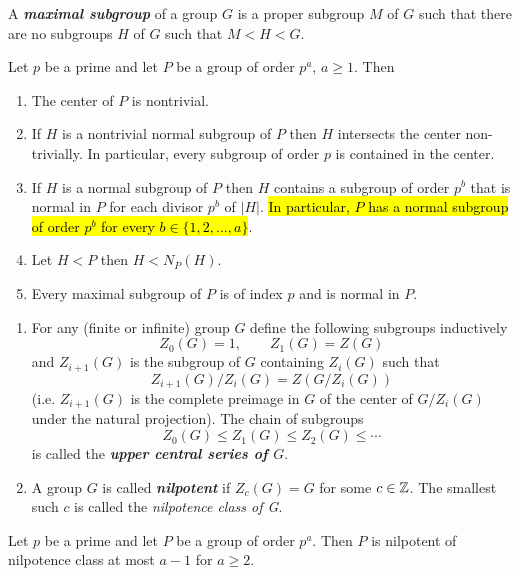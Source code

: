 \begin{defn}
A \textbf{\textit{maximal subgroup}} of a group $G$ is a proper subgroup $M$ of $G$ such that there are no subgroups $H$ of $G$ such that $M<H<G$.
\end{defn}

\nl

\begin{thm}
Let $p$ be a prime and let $P$ be a group of order $p^a$, $a\geq 1$. Then
\begin{enumerate}
\item The center of $P$ is nontrivial.
\item If $H$ is a nontrivial normal subgroup of $P$ then $H$ intersects the center non-trivially. In particular, every subgroup of order $p$ is contained in the center.
\item If $H$ is a normal subgroup of $P$ then $H$ contains a subgroup of order $p^b$ that is normal in $P$ for each divisor $p^b$ of $|H|$. \hl{In particular, $P$ has a normal subgroup of order $p^b$ for every $b\in \{1,2,\ldots,a\}$}.
\item Let $H< P$ then $H<N_P(H)$.
\item Every maximal subgroup of $P$ is of index $p$ and is normal in $P$.
\end{enumerate}
\end{thm}

\nl

\begin{defn}\nl
\begin{enumerate}
\item For any (finite or infinite) group $G$ define the following subgroups inductively
\[Z_0(G) = 1,\qquad Z_1(G)= Z(G)\]
and $Z_{i+1}(G)$ is the subgroup of $G$ containing $Z_i(G)$ such that
\[Z_{i+1}(G)/Z_i(G) = Z(G/Z_i(G))\]
(i.e. $Z_{i+1}(G)$ is the complete preimage in $G$ of the center of $G/Z_i(G)$ under the natural projection). The chain of subgroups
\[Z_0(G)\leq Z_1(G)\leq Z_2(G)\leq\cdots\]
is called the\textbf{ \textit{upper central series of $G$}}.
\item A group $G$ is called \textit{\textbf{nilpotent}} if $Z_c(G) = G$ for some $c\in \mathbb{Z}$. The smallest such $c$ is called the \textit{nilpotence class of G}.
\end{enumerate}
\end{defn}

\nl

\begin{prop}
Let $p$ be a prime and let $P$ be a group of order $p^a$. Then $P$ is nilpotent of nilpotence class at most $a-1$ for $a\geq 2$.
\end{prop}

